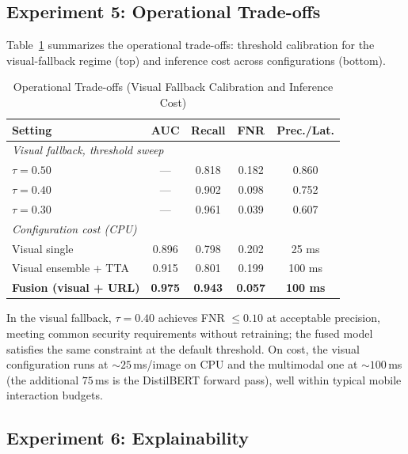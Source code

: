 \documentclass[conference]{IEEEtran}
\begin{document}
\subsection{Experiment 5: Operational Trade-offs}

Table~\ref{tab:ops} summarizes the operational trade-offs: threshold calibration for the visual-fallback regime (top) and inference cost across configurations (bottom).

\begin{table}[htp]
\caption{Operational Trade-offs (Visual Fallback Calibration and Inference Cost)}
\label{tab:ops}
\centering
\small
\begin{tabular}{lcccc}
\toprule
\textbf{Setting} & \textbf{AUC} & \textbf{Recall} & \textbf{FNR} & \textbf{Prec./Lat.} \\
\midrule
\multicolumn{5}{l}{\emph{Visual fallback, threshold sweep}} \\
$\tau = 0.50$ & --- & 0.818 & 0.182 & 0.860 \\
$\tau = 0.40$ & --- & 0.902 & 0.098 & 0.752 \\
$\tau = 0.30$ & --- & 0.961 & 0.039 & 0.607 \\
\midrule
\multicolumn{5}{l}{\emph{Configuration cost (CPU)}} \\
Visual single & 0.896 & 0.798 & 0.202 & 25 ms \\
Visual ensemble + TTA & 0.915 & 0.801 & 0.199 & 100 ms \\
\textbf{Fusion (visual + URL)} & \textbf{0.975} & \textbf{0.943} & \textbf{0.057} & \textbf{100 ms} \\
\bottomrule
\end{tabular}
\end{table}

In the visual fallback, $\tau = 0.40$ achieves FNR $\leq 0.10$ at acceptable precision, meeting common security requirements without retraining; the fused model satisfies the same constraint at the default threshold. On cost, the visual configuration runs at $\sim$$25$\,ms/image on CPU and the multimodal one at $\sim$$100$\,ms (the additional $75$\,ms is the DistilBERT forward pass), well within typical mobile interaction budgets.

\subsection{Experiment 6: Explainability}
\label{sec:xai}
\end{document}
